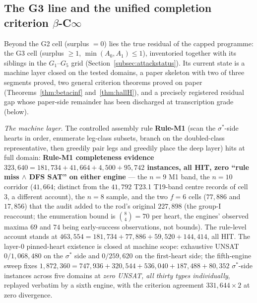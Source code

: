 \subsection{The G3 line and the unified completion criterion
\texorpdfstring{$\beta$-C$\infty$}{beta-C-inf}}\label{subsec:g3line}

Beyond the G2 cell (surplus $=0$) lies the true residual of the capped programme: the G3
cell (surplus $\ge1$, $\min(A_0,A_1)\le1$), inventoried together with its siblings in the
$G_1$--$G_5$ grid (Section~\ref{subsec:attackstatus}). Its current state is a machine layer
closed on the tested domains, a paper skeleton with two of three segments proved, two
general criterion theorems proved on paper (Theorems~\ref{thm:betacinf}
and~\ref{thm:hallH}), and a precisely registered residual gap whose paper-side remainder
has been discharged at transcription grade (below).

\emph{The machine layer.} The controlled assembly rule \textbf{Rule-M1} (scan the
$\sigma^\ast$-side hearts in order, enumerate leg-class subsets, branch on the doubled-class
representative, then greedily pair legs and greedily place the deep layer) hits at full
domain: \textbf{Rule-M1 completeness evidence $323{,}640=181{,}734+41{,}664+4{,}500+95{,}742$
instances, all HIT, zero ``rule miss $\wedge$ DFS SAT'' on either engine} --- the $n=9$ M1
band, the $n=10$ corridor ($41{,}664$; distinct from the $41{,}792$ T23.1 T19-band centre
records of cell 3, a different account), the $n=8$ sample, and the two $f=6$ cells
($77{,}886$ and $17{,}856$) that the audit added to the rod's original $227{,}898$ (the
group-I reaccount; the enumeration bound is $\binom{8}{4}=70$ per heart, the engines'
observed maxima $69$ and $74$ being early-success observations, not bounds). The rule-level
account stands at $463{,}554=181{,}734+77{,}886+59{,}520+144{,}414$, all HIT. The layer-$0$
pinned-heart existence is closed at machine scope: exhaustive UNSAT $0/1{,}068{,}480$ on the
$\sigma^\ast$ side and $0/259{,}620$ on the first-heart side; the fifth-engine sweep fixes
$1{,}872{,}360=747{,}936+320{,}544+536{,}040+187{,}488+80{,}352$ $\sigma^\ast$-side
instances across five domains at \emph{zero UNSAT, all thirty types individually}, replayed
verbatim by a sixth engine, with the criterion agreement $331{,}644\times2$ at zero
divergence.

